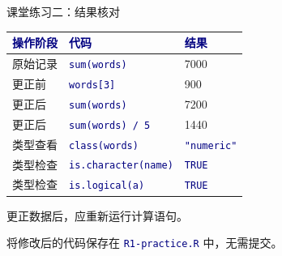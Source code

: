 \documentclass[14pt,compress,t,noamsthm,notheorem,table,handout,fontset=none]{ctexbeamer}
\newcommand{\code}[1]{\textcolor{navy}{\texttt{#1}}}
\newcommand{\thead}[1]{\textcolor{navy}{\textbf{#1}}}
\begin{document}
\begin{frame}{课堂练习二：结果核对}
  \small
  \vspace{0.4em}
  \renewcommand{\arraystretch}{1.25}
  \begin{tabular*}{\linewidth}{@{\extracolsep{\fill}}lll@{}}
    \toprule
    \thead{操作阶段} & \thead{代码} & \thead{结果} \\
    \midrule
    原始记录 & \code{sum(words)} & 7000 \\
    更正前 & \code{words[3]} & 900 \\
    更正后 & \code{sum(words)} & 7200 \\
    更正后 & \code{sum(words) / 5} & 1440 \\
    类型查看 & \code{class(words)} & \code{"numeric"} \\
    类型检查 & \code{is.character(name)} & \code{TRUE} \\
    类型检查 & \code{is.logical(a)} & \code{TRUE} \\
    \bottomrule
  \end{tabular*}\par
  \vfill
  更正数据后，应重新运行计算语句。\par
  将修改后的代码保存在 \code{R1-practice.R} 中，无需提交。
\end{frame}

\end{document}
